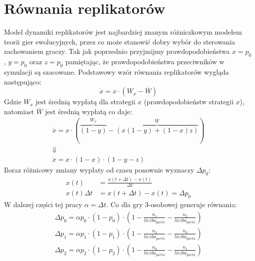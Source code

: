 
\section{Równania replikatorów}
\label{sec:r_repli}
Model dynamiki replikatorów jest najbardziej znanym różniczkowym modelem teorii gier ewolucyjnych, przez co może stanowić dobry wybór do sterowania zachowaniem graczy. Tak jak poprzednio przyjmijmy prawdopodobieństwa $x=p_0$, $y=p_0$ oraz $z=p_0$ pamiętając, że prawdopodobieństwa przeciwników w symulacji są szacowane. Podstawowy wzór równania replikatorów wygląda następująco:
\begin{equation}
\dot{x} = x \cdot ( W_x - \overline{W})
\end{equation}
Gdzie $W_x$ jest średnią wypłatą dla strategii $x$ (prawdopodobieństw strategii $x$), natomiast $\overline{W}$ jest średnią wypłatą co daje:
\begin{gather*}
\dot{x} = x \cdot ( \overbrace{(1-y)}^{W_x} - \overbrace{(x(1-y) + (1-x)z)}^{\overline{W}}) \\
\Downarrow \\
\dot{x} = x \cdot (1-x) \cdot (1-y-z)
\end{gather*}
Iloraz różnicowy zmiany wypłaty od czasu ponownie wyznaczy $\Delta p_0$:
\begin{align*}
x(t) &= \frac{x(t+\Delta t)-x(t)}{\Delta t} \\
x(t) \Delta t &= x(t+\Delta t)-x(t) = \Delta p_0
\end{align*} 
W dalszej części tej pracy $\alpha=\Delta t$. Co dla gry 3-osobowej generuje równania:
\begin{align} \label{eq:repli}
\Delta p_0 = \alpha p_0 \cdot (1 - p_0) \cdot (1 - \frac{n_1}{liczba_{partii}} - \frac{n_2}{liczba_{partii}}) \nonumber \\
\Delta p_1 = \alpha p_1 \cdot (1 - p_1) \cdot (1 - \frac{n_2}{liczba_{partii}} - \frac{n_0}{liczba_{partii}}) \\
\Delta p_2 = \alpha p_2 \cdot (1 - p_2) \cdot (1 - \frac{n_0}{liczba_{partii}} - \frac{n_1}{liczba_{partii}}) \nonumber
\end{align} 


